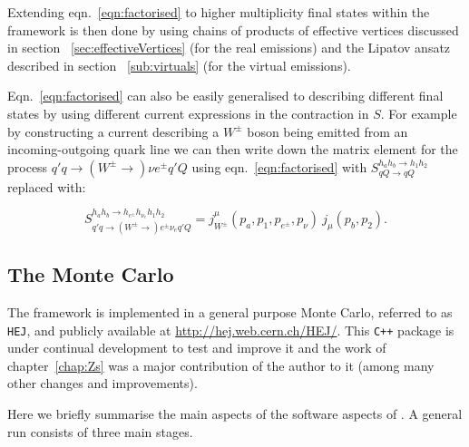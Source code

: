		Extending eqn.~\eqref{eqn:factorised} to higher multiplicity final states within the \hej
		framework is then done by using chains of products of effective vertices discussed in section
		~\eqref{sec:effectiveVertices} (for the real emissions) and the Lipatov ansatz described in section
		~\eqref{sub:virtuals} (for the virtual emissions).

		Eqn.~\eqref{eqn:factorised} can also be easily generalised to describing different final states by using
		different current expressions in the contraction in $S$.  For example by constructing a current
		describing a $W^\pm$ boson being emitted from an incoming-outgoing quark line we can then write down
		the matrix element for the process $q'q\to(W^\pm\to)\nu e^\pm q'Q$ using eqn.~\eqref{eqn:factorised}
		with $S_{qQ\rightarrow qQ}^{h_ah_b\rightarrow h_1h_2}$ replaced with:

		\begin{equation}
			S_{q'q\to(W^\pm\to)e^\pm\nu_eq'Q}^{h_ah_b\to h_{e^\pm}h_{\nu_e}h_1h_2} =
			{j^\mu_{W^\pm}(p_a, p_1, p_{e^\pm}, p_\nu)\ j_\mu(p_b, p_2)}.
			\label{eqn:wExample}
		\end{equation}

	\subsection{The \hej Monte Carlo}

		The \hej framework is implemented in a general purpose Monte Carlo, referred to as
		\texttt{HEJ}, and publicly available at \url{http://hej.web.cern.ch/HEJ/}.  This
		\texttt{C++} package is under continual development to test and improve it and the work
		of chapter~\ref{chap:Zs} was a major contribution of the author to it (among many other
		changes and improvements).

		Here we briefly summarise the main aspects of the software aspects of \hej.  A general
		\HEJ run consists of three main stages.

